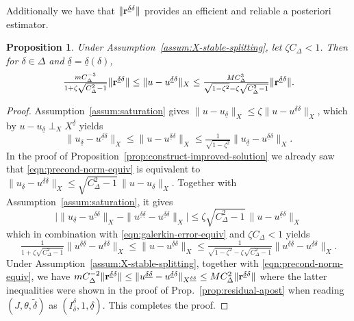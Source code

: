 \documentclass[11pt,a4paper,oneside,english]{amsart}
\numberwithin{equation}{section}
\numberwithin{theorem}{section}
\newtheorem{prop}[theorem]{Proposition}
\theoremstyle{definition}
\newcommand{\udelta}{{\underline{\delta}}}
\newcommand{\jw}[1]{{\color{red}{JW: #1}}}
\begin{document}
Additionally we have that $\|{\bf r}^{\udelta \delta}\|$ provides an efficient and reliable a posteriori estimator.
\begin{prop}
  \label{prop:residual-efficient-reliable}
  Under Assumption~\ref{assum:X-stable-splitting}, let $\zeta C_\Delta<1$. Then
  for $\delta \in \Delta$ and $\udelta=\udelta(\delta)$,
  \[
    \tfrac{m C_\Delta^{-3}}{1+\zeta \sqrt{C_\Delta^2-1}} \|{\bf r}^{\udelta \delta}\|
    \leq \|u-u^{\udelta \delta}\|_X
    \leq \tfrac{M C_\Delta^3}{\sqrt{1-\zeta^2}-\zeta\sqrt{C_\Delta^2-1}} \|{\bf r}^{\udelta \delta}\|.
  \]
\end{prop}
\begin{proof}
  Assumption~\ref{assum:saturation} gives $\|u-u_\udelta\|_X \leq \zeta \|u-u^{\udelta \delta}\|_X$,
  which by $u-u_\udelta\perp_{X} X^\udelta$ yields
  \begin{equation}
   \|u_\udelta-u^{\udelta \delta}\|_{X} \leq \|u-u^{\udelta \delta}\|_{X} \leq \tfrac{1}{\sqrt{1-\zeta^2}} \|u_\udelta-u^{\udelta \delta}\|_{X}.
    \label{eqn:galerkin-error-equiv}
  \end{equation}
  In the proof of Proposition~\ref{prop:construct-improved-solution} we already
  saw that \eqref{eqn:precond-norm-equiv} is equivalent to
  $\|u_\udelta-u^{\udelta \udelta}\|_X \leq \sqrt{C_\Delta^2 -1}\, \|u-u_{\udelta}\|_X$.
  Together with Assumption~\ref{assum:saturation}, it gives
  \[
    \Big|\|u_\udelta-u^{\udelta \delta}\|_X-\|u^{\udelta \udelta}-u^{\udelta \delta}\|_X \Big| \leq \zeta \sqrt{C_\Delta^2-1}\,\|u-u^{\udelta\delta}\|_X
  \]
  which in combination with \eqref{eqn:galerkin-error-equiv} and $\zeta C_\Delta<1$ yields
  \[
    \tfrac{1}{1+\zeta \sqrt{C_\Delta^2-1}} \|u^{\udelta \udelta}-u^{\udelta \delta}\|_X
    \leq \|u-u^{\udelta \delta}\|_X
    \leq \tfrac{1}{\sqrt{1-\zeta^2}-\zeta\sqrt{C_\Delta^2-1}} \|u^{\udelta \udelta}-u^{\udelta \delta}\|_X.
  \]
  Under Assumption~\ref{assum:X-stable-splitting}, together with \eqref{eqn:precond-norm-equiv},
  we have $m C^{-2}_\Delta \|{\bf r}^{\udelta \delta}\| \leq \|u^{\udelta \udelta}-u^{\udelta \delta}\|_{X^{\udelta \udelta}} \leq M C_\Delta^2 \|{\bf r}^{\udelta \delta}\|$
  where the latter inequalities were shown in the proof of Prop.~\ref{prop:residual-apost}
  when reading $(J,\theta,\tilde{\delta})$ as $(I_\delta^\udelta,1,\udelta)$. This completes the proof.\jw{dit heb ik nog niet gecheckt}
\end{proof}
\end{document}
